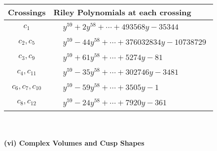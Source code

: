 \documentclass[1p]{elsarticle_modified}
\theoremstyle{definition}
\begin{document}
\begin{tabular}{m{50pt}|m{274pt}}
Crossings & \hspace{64pt}Riley Polynomials at each crossing \\
\hline $$\begin{aligned}c_{1}\end{aligned}$$&$\begin{aligned}
&y^{59}+2 y^{58}+\cdots+493568 y-35344
\end{aligned}$\\
\hline $$\begin{aligned}c_{2},c_{5}\end{aligned}$$&$\begin{aligned}
&y^{59}-44 y^{58}+\cdots+376032834 y-10738729
\end{aligned}$\\
\hline $$\begin{aligned}c_{3},c_{9}\end{aligned}$$&$\begin{aligned}
&y^{59}+61 y^{58}+\cdots+5274 y-81
\end{aligned}$\\
\hline $$\begin{aligned}c_{4},c_{11}\end{aligned}$$&$\begin{aligned}
&y^{59}-35 y^{58}+\cdots+302746 y-3481
\end{aligned}$\\
\hline $$\begin{aligned}c_{6},c_{7},c_{10}\end{aligned}$$&$\begin{aligned}
&y^{59}-59 y^{58}+\cdots+3505 y-1
\end{aligned}$\\
\hline $$\begin{aligned}c_{8},c_{12}\end{aligned}$$&$\begin{aligned}
&y^{59}-24 y^{58}+\cdots+7920 y-361
\end{aligned}$\\
\hline
\end{tabular}\\~\\
\newpage\flushleft \textbf{(vi) Complex Volumes and Cusp Shapes}
\end{document}
